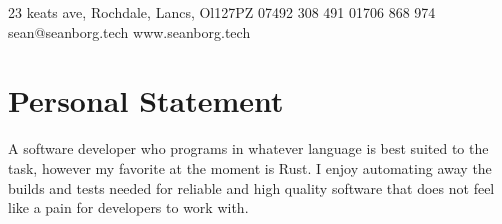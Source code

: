 \documentclass{my_cv}
\begin{document}
\contactInfo
{23 keats ave, Rochdale, Lancs, Ol127PZ}
{07492 308 491}
{01706 868 974}
{sean@seanborg.tech}
{www.seanborg.tech}

\section{Personal Statement}

A software developer who programs in whatever language is best suited to the task, however my favorite at the moment is Rust.
I enjoy automating away the builds and tests needed for reliable and high quality software that does not feel like a pain for developers to work with.



%
%
%
%
%
%
%
%
%
%
%
%
%
\end{document}
